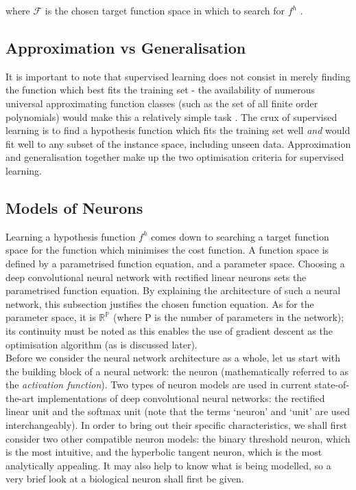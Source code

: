 \documentclass[a4paper,11pt]{article}
\begin{document}
where $\mathcal{F}$ is the chosen target function space in which to search for $f^{h}$ . \\

\subsection{Approximation vs Generalisation}

It is important to note that supervised learning does not consist in merely finding the function which best fits the training set - the availability of numerous universal approximating function classes (such as the set of all finite order polynomials) would make this a relatively simple task \cite{univ-approx}. The crux of supervised learning is to find a hypothesis function which fits the training set well \textit{and} would fit well to any subset of the instance space, including unseen data. Approximation and generalisation together make up the two optimisation criteria for supervised learning.\\

\subsection{Models of Neurons}

Learning a hypothesis function $f^{h}$ comes down to searching a target function space for the function which minimises the cost function. A function space is defined by a parametrised function equation, and a parameter space. Choosing a deep convolutional neural network with rectified linear neurons sets the parametrised function equation. By explaining the architecture of such a neural network, this subsection justifies the chosen function equation. As for the parameter space, it is $\mathbb{R^{P}}$ (where P is the number of parameters in the network); its continuity must be noted as this enables the use of gradient descent as the optimisation algorithm (as is discussed later). \\

Before we consider the neural network architecture as a whole, let us start with the building block of a neural network: the neuron (mathematically referred to as the \textit{activation function}). Two types of neuron models are used in current state-of-the-art implementations of deep convolutional neural networks: the rectified linear unit and the softmax unit (note that the terms `neuron' and `unit' are used interchangeably). In order to bring out their specific characteristics, we shall first consider two other compatible neuron models: the binary threshold neuron, which is the most intuitive, and the hyperbolic tangent neuron, which is the most analytically appealing. It may also help to know what is being modelled, so a very brief look at a biological neuron shall first be given.
\end{document}

